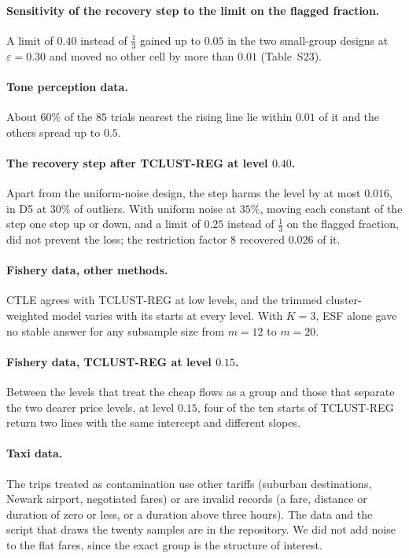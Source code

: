 \paragraph{Sensitivity of the recovery step to the limit on the flagged fraction.} A limit of $0.40$
instead of $\tfrac13$ gained up to $0.05$ in the two small-group designs at $\varepsilon=0.30$
and moved no other cell by more than $0.01$ (Table~S23).

\paragraph{Tone perception data.} About $60\%$ of the $85$ trials nearest the rising line lie
within $0.01$ of it and the others spread up to $0.5$.

\paragraph{The recovery step after TCLUST-REG at level $0.40$.} Apart from the uniform-noise
design, the step harms the level by at most $0.016$, in D5 at $30\%$ of outliers. With uniform
noise at $35\%$, moving each constant of the step one step up or down, and a limit of $0.25$
instead of $\tfrac13$ on the flagged fraction, did not prevent the loss; the restriction factor
$8$ recovered $0.026$ of it.

\paragraph{Fishery data, other methods.} CTLE agrees with TCLUST-REG at low levels, and the
trimmed cluster-weighted model varies with its starts at every level. With $K=3$, ESF
alone gave no stable answer for any subsample size from $m=12$ to $m=20$.

\paragraph{Fishery data, TCLUST-REG at level $0.15$.} Between the levels that treat the cheap
flows as a group and those that separate the two dearer price levels, at level $0.15$, four of
the ten starts of TCLUST-REG return two lines with the same intercept and different slopes.

\paragraph{Taxi data.} The trips treated as contamination use other tariffs (suburban
destinations, Newark airport, negotiated fares) or are invalid records (a fare, distance or
duration of zero or less, or a duration above three hours). The data and the script that draws
the twenty samples are in the repository. We did not add noise to the flat fares, since the exact
group is the structure of interest.

